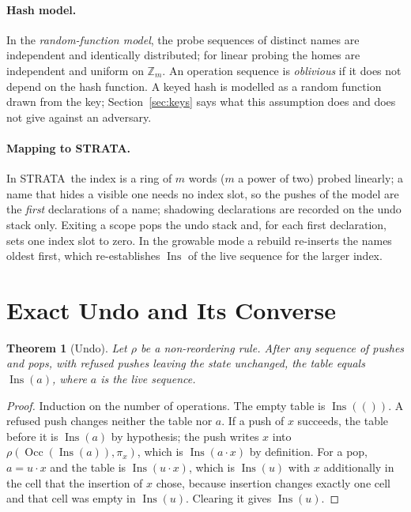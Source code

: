 \documentclass[11pt,a4paper]{article}
\newtheorem{theorem}{Theorem}
\theoremstyle{definition}
\theoremstyle{remark}
\newcommand{\st}{STRATA}
\newcommand{\Z}{\mathbb{Z}}
\DeclareMathOperator{\Ins}{Ins}
\DeclareMathOperator{\Occ}{Occ}
\begin{document}
\paragraph{Hash model.} In the \emph{random-function model}, the probe sequences of distinct names are independent and identically distributed; for linear probing the homes are independent and uniform on $\Z_m$. An operation sequence is \emph{oblivious} if it does not depend on the hash function. A keyed hash is modelled as a random function drawn from the key; Section~\ref{sec:keys} says what this assumption does and does not give against an adversary.

\paragraph{Mapping to \st.} In \st\ the index is a ring of $m$ words ($m$ a power of two) probed linearly; a name that hides a visible one needs no index slot, so the pushes of the model are the \emph{first} declarations of a name; shadowing declarations are recorded on the undo stack only. Exiting a scope pops the undo stack and, for each first declaration, sets one index slot to zero. In the growable mode a rebuild re-inserts the names oldest first, which re-establishes $\Ins$ of the live sequence for the larger index.

\section{Exact Undo and Its Converse}\label{sec:undo}

\begin{theorem}[Undo]\label{thm:undo}
Let $\rho$ be a non-reordering rule. After any sequence of pushes and pops, with refused pushes leaving the state unchanged, the table equals $\Ins(a)$, where $a$ is the live sequence.
\end{theorem}
\begin{proof}
Induction on the number of operations. The empty table is $\Ins(())$. A refused push changes neither the table nor $a$. If a push of $x$ succeeds, the table before it is $\Ins(a)$ by hypothesis; the push writes $x$ into $\rho(\Occ(\Ins(a)),\pi_x)$, which is $\Ins(a\cdot x)$ by definition. For a pop, $a=u\cdot x$ and the table is $\Ins(u\cdot x)$, which is $\Ins(u)$ with $x$ additionally in the cell that the insertion of $x$ chose, because insertion changes exactly one cell and that cell was empty in $\Ins(u)$. Clearing it gives $\Ins(u)$.
\end{proof}
\end{document}
